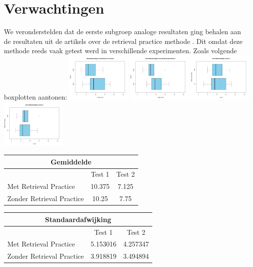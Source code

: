 \documentclass{hogent-article}
\begin{document}
	\section{Verwachtingen} %
	We veronderstelden dat de eerste subgroep analoge resultaten ging behalen aan de resultaten uit de artikels over de retrieval practice methode \autocite{butler2010repeated, pyc2012test, karpicke2007repeated, karpicke2008critical}. Dit omdat deze methode reeds vaak getest werd in verschillende experimenten. Zoals volgende boxplotten aantonen:
	\includegraphics[width=120px]{Verwacht_RetrievalPractice}
	\includegraphics[width=120px]{Verwacht_ZonderRetrievalPractice}
	\includegraphics[width=120px]{Verwacht_RT_Score1}
	\includegraphics[width=120px]{Verwacht_RT_Score2}
	
	\begin{tabular}{ |p{10em}|c|c| }
	\hline
		\multicolumn{3}{|c|}{Gemiddelde} \\
	\hline
		& Test 1 & Test 2 \\
	\hline
		Met Retrieval Practice & 10.375 & 7.125 \\
		Zonder Retrieval Practice & 10.25 & 7.75 \\
	\hline
	\end{tabular}
	
	\begin{tabular}{ |p{10em}|c|c| }
	\hline
		\multicolumn{3}{|c|}{Standaardafwijking} \\
	\hline
		& Test 1 & Test 2 \\
	\hline
		Met Retrieval Practice & 5.153016 & 4.257347 \\
		Zonder Retrieval Practice & 3.918819 & 3.494894 \\
	\hline
	\end{tabular}
	
\end{document}
